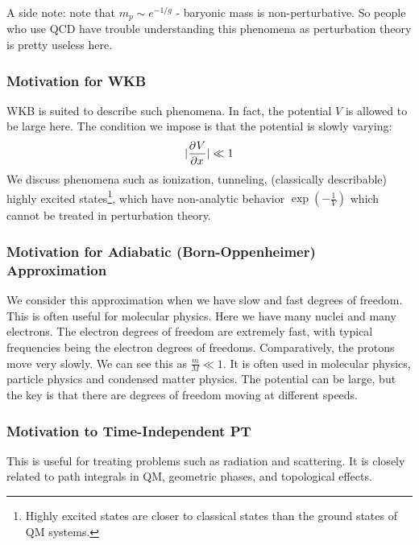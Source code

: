 A side note: note that $m_p \sim e^{-1/g}$ - baryonic mass is non-perturbative. So people who use QCD have trouble understanding this phenomena as perturbation theory is pretty useless here.

\subsubsection{Motivation for WKB}
WKB is suited to describe such phenomena. In fact, the potential $V$ is allowed to be large here. The condition we impose is that the potential is slowly varying:
\begin{equation}
    \abs{\dpd{V}{x}} \ll 1
\end{equation}
We discuss phenomena such as ionization, tunneling, (classically describable) highly excited states\footnote{Highly excited states are closer to classical states than the ground states of QM systems.}, which have non-analytic behavior $\exp(-\frac{1}{V})$ which cannot be treated in perturbation theory. 

\subsubsection{Motivation for Adiabatic (Born-Oppenheimer) Approximation}
We consider this approximation when we have slow and fast degrees of freedom. This is often useful for molecular physics. Here we have many nuclei and many electrons. The electron degrees of freedom are extremely fast, with typical frequencies being the electron degrees of freedoms. Comparatively, the protons move very slowly. We can see this as $\frac{m}{M} \ll 1$. It is often used in molecular physics, particle physics and condensed matter physics. The potential can be large, but the key is that there are degrees of freedom moving at different speeds.

\subsubsection{Motivation to Time-Independent PT}
This is useful for treating problems such as radiation and scattering. It is closely related to path integrals in QM, geometric phases, and topological effects. 

